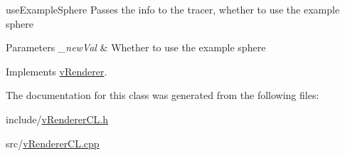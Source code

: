 use\-Example\-Sphere Passes the info to the tracer, whether to use the example sphere 


\begin{DoxyParams}{Parameters}
{\em \-\_\-new\-Val} & Whether to use the example sphere \\
\hline
\end{DoxyParams}


Implements \hyperlink{classvRenderer_ac4e01b762661e82813c8909d1c7a47c3}{v\-Renderer}.



The documentation for this class was generated from the following files\-:\begin{DoxyCompactItemize}
\item 
include/\hyperlink{vRendererCL_8h}{v\-Renderer\-C\-L.\-h}\item 
src/\hyperlink{vRendererCL_8cpp}{v\-Renderer\-C\-L.\-cpp}\end{DoxyCompactItemize}
